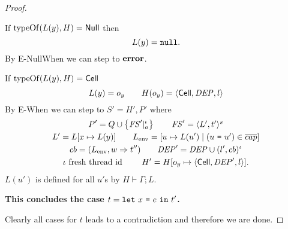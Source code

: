 \begin{proof}
\begin{description}
\begin{description}
          If $\mbox{$\mathrm{typeOf}$}(L(y), H) = \mbox{$\mathsf{Null}$}$ then
          \begin{equation*}
            L(y) = \mbox{\mdseries\texttt{null}}.
          \end{equation*}
          By {\sc E-NullWhen} we can step to $\mbox{{\bf error}}$. \contradiction

          If $\mbox{$\mathrm{typeOf}$}(L(y), H) = \mbox{$\mathsf{Cell}$}$
          \begin{equation*}
            L(y) = o_y  \quad\quad H(o_y) = \mbox{$\langle \mbox{$\mathsf{Cell}$}{}, \mathit{DEP}, l \rangle$}
          \end{equation*}
          By {\sc E-When} we can step to $S' = H', P'$ where
          \begin{equation*}
            \begin{gathered}
              P' = Q \cup \left\{\mathit{FS}'|_a^\iota \right\} \quad\quad \mathit{FS}' = \mbox{$\langle L',
              t' \rangle^s$} \\
              L' = L[x \mapsto L(y)] \quad\quad L_{\text{env}} = [u \mapsto L(u')
              \mid
              (\mbox{\mdseries$u$~\texttt{=}~$u'$}) \in \overline{cap}] \\
              cb = ( L_{\text{env}}, w \Rightarrow t'' ) \quad\quad \mathit{DEP}' = \mathit{DEP}
              \cup (l', cb)^\iota \\
              \iota \text{ fresh thread id } \quad\quad H' = H[o_y \mapsto \mbox{$\langle \mbox{$\mathsf{Cell}$}{}, \mathit{DEP}',
              l \rangle$}].
            \end{gathered}
          \end{equation*}
          $L(u')$ is defined for all $u'$s by $H \vdash \Gamma; L$. \contradiction
      \end{description}
      {\bf This concludes the case $t = \mbox{\mdseries\texttt{let}~$x$~\texttt{=}~$e$~\texttt{in}~$t'$}$.}
  \end{description}
  Clearly all cases for $t$ leads to a contradiction and therefore we are done.
\end{proof}


